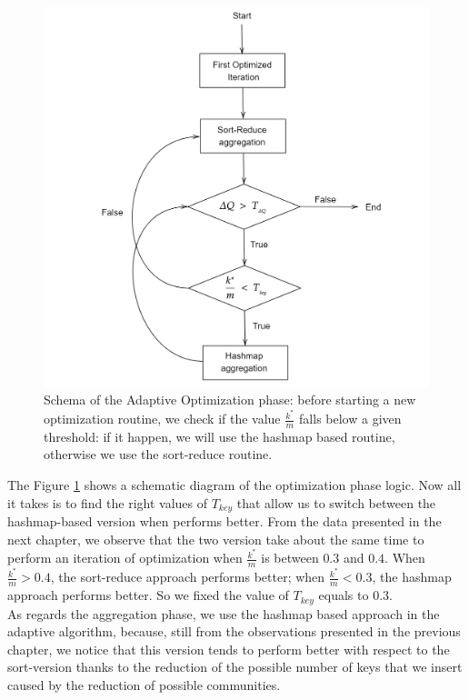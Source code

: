 \begin{figure}[t!]
	\centering
	\includegraphics[width=0.7\linewidth]{0-resources/adaptive_schema}
	\caption{Schema of the Adaptive Optimization phase: before starting a new optimization routine, we check if the value $\frac{k^*}{m}$ falls below a given threshold: if it happen, we will use the hashmap based routine, otherwise we use the sort-reduce routine.}
	\label{fig:adaptiveschema}
\end{figure}
The Figure \ref{fig:adaptiveschema} shows a schematic diagram of the optimization phase logic. Now all it takes is to find the right values of $T_{key}$ that allow us to switch between the hashmap-based version when performs better. From the data presented in the next chapter, we observe that the two version take about the same time to perform an iteration of optimization when $\frac{k^*}{m}$ is between $0.3$ and $0.4$. When  $\frac{k^*}{m} > 0.4 $, the sort-reduce approach performs better; when  $\frac{k^*}{m} < 0.3 $, the hashmap approach performs better.
So we fixed the value of $T_{key}$ equals to $0.3$.\\
As regards the aggregation phase, we use the hashmap based approach in the adaptive algorithm, because, still from the observations presented in the previous chapter, we notice that this version tends to perform better with respect to the sort-version thanks to the reduction of the possible number of keys that we insert caused by the reduction of possible communities.
